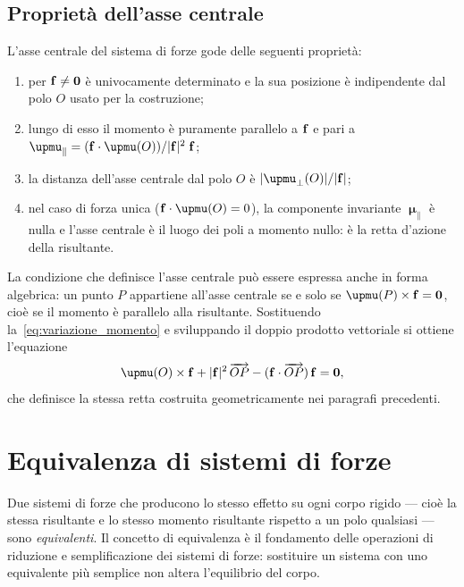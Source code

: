 \subsection{Proprietà dell'asse centrale}

L'asse centrale del sistema di forze gode delle seguenti
proprietà:
\begin{enumerate}[label=(\roman*)]
	\item per $\mathbf{f} \neq \mathbf{0}$ è univocamente determinato e
	la sua posizione è indipendente dal polo $O$ usato per la
	costruzione;
	\item lungo di esso il momento è puramente parallelo a
	$\mathbf{f}$ e pari a
	$\bm{\upmu}_{\parallel}
	= (\fb \cdot \bm{\upmu}(O))/|\fb|^2\;\fb$;
	\item la distanza dell'asse centrale dal polo $O$ è
	$|\bm{\upmu}_{\perp}(O)|/|\fb|$;
	\item nel caso di forza unica
	($\fb \cdot \bm{\upmu}(O) = 0$), la componente invariante
	$\bm{\upmu}_{\parallel}$ è nulla e l'asse centrale è il
	luogo dei poli a momento nullo: è la retta d'azione della
	risultante.
\end{enumerate}

\begin{oss}
	La condizione che definisce l'asse centrale può essere
	espressa anche in forma algebrica: un punto $P$ appartiene
	all'asse centrale se e solo se
	$\bm{\upmu}(P) \times \fb = \zerovb$, cioè se il momento
	è parallelo alla risultante. Sostituendo
	la~\eqref{eq:variazione_momento} e sviluppando il doppio
	prodotto vettoriale si ottiene l'equazione
	\begin{equation}\label{eq:asse_centrale_algebrica_F}
		\bm{\upmu}(O) \times \fb
		+ |\fb|^2\,\overrightarrow{OP}
		- (\fb \cdot \overrightarrow{OP})\,\fb
		= \zerovb,
	\end{equation}
	che definisce la stessa retta costruita geometricamente
	nei paragrafi precedenti.
\end{oss}

\section{Equivalenza di sistemi di forze}\label{sec:equivalenza}

Due sistemi di forze che producono lo stesso effetto su ogni
corpo rigido --- cioè la stessa risultante e lo stesso momento
risultante rispetto a un polo qualsiasi --- sono
\textit{equivalenti}. Il concetto di equivalenza è il
fondamento delle operazioni di riduzione e semplificazione
dei sistemi di forze: sostituire un sistema con uno equivalente
più semplice non altera l'equilibrio del corpo.

